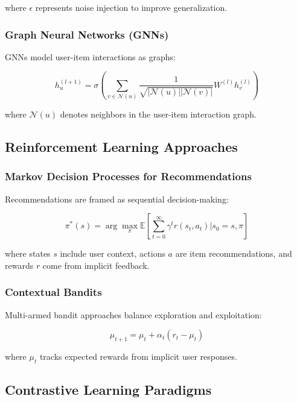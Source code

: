 where $\epsilon$ represents noise injection to improve generalization.

\subsubsection{Graph Neural Networks (GNNs)}

GNNs model user-item interactions as graphs:

\begin{equation}
h_u^{(l+1)} = \sigma\left(\sum_{v \in \mathcal{N}(u)} \frac{1}{\sqrt{|\mathcal{N}(u)||\mathcal{N}(v)|}} W^{(l)} h_v^{(l)}\right)
\label{eq:gnn}
\end{equation}

where $\mathcal{N}(u)$ denotes neighbors in the user-item interaction graph.

\subsection{Reinforcement Learning Approaches}

\subsubsection{Markov Decision Processes for Recommendations}

Recommendations are framed as sequential decision-making:

\begin{equation}
\pi^*(s) = \arg\max_\pi \mathbb{E}\left[\sum_{t=0}^\infty \gamma^t r(s_t, a_t) \bigg| s_0 = s, \pi\right]
\label{eq:rl_mdp}
\end{equation}

where states $s$ include user context, actions $a$ are item recommendations, and rewards $r$ come from implicit feedback.

\subsubsection{Contextual Bandits}

Multi-armed bandit approaches balance exploration and exploitation:

\begin{equation}
\mu_{t+1} = \mu_t + \alpha_t (r_t - \mu_t)
\label{eq:bandit_update}
\end{equation}

where $\mu_t$ tracks expected rewards from implicit user responses.

\subsection{Contrastive Learning Paradigms}

